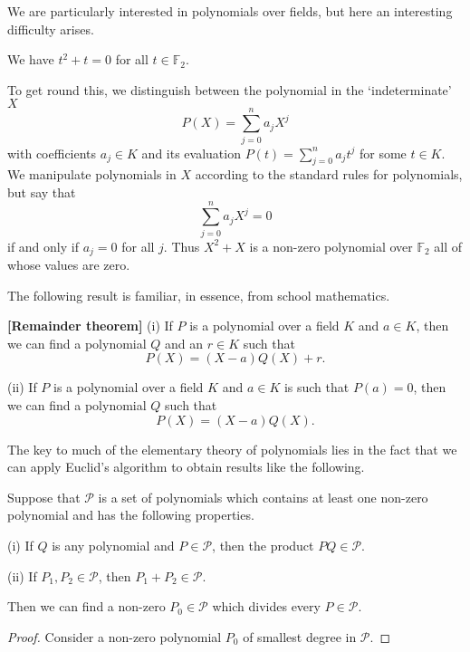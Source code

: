 We are particularly interested in polynomials over
fields, but here an interesting difficulty arises.
\begin{example}
We have $t^{2}+t=0$ for all $t\in{\mathbb F}_{2}$.
\end{example}
To get round this, we distinguish between the
polynomial in the `indeterminate' $X$
\[P(X)=\sum_{j=0}^{n}a_{j}X^{j}\]
with coefficients $a_{j}\in K$ and its
evaluation $P(t)=\sum_{j=0}^{n}a_{j}t^{j}$
for some $t\in K$. We manipulate polynomials in $X$
according to the standard rules for polynomials,
but say that
\[\sum_{j=0}^{n}a_{j}X^{j}=0\]
if and only if $a_{j}=0$ for all $j$.
Thus $X^{2}+X$ is a non-zero polynomial
over ${\mathbb F}_{2}$ all of whose values are zero.

The following result is familiar, in essence,
from school mathematics.
\begin{lemma}{\bf [Remainder theorem]}\label{remainder}
(i) If $P$ is a polynomial over a field $K$
and $a\in K$, then we can find a polynomial $Q$ and an
$r\in K$ such that
\[P(X)=(X-a)Q(X)+r.\]

(ii) If $P$ is a polynomial over a field $K$
and $a\in K$ is such that $P(a)=0$, then
we can find a polynomial $Q$ such that
\[P(X)=(X-a)Q(X).\]
\end{lemma}

The key to much of the elementary theory of
polynomials lies in the fact that we can apply
Euclid's algorithm to obtain results like the
following.
\begin{theorem}\label{greatest common}
Suppose that $\mathcal{P}$ is a
set of polynomials which contains at least one
non-zero polynomial and has the following properties.

(i) If $Q$ is any polynomial and $P\in\mathcal{P}$,
then the product $PQ\in\mathcal{P}$.

(ii) If $P_{1},P_{2}\in \mathcal{P}$,
then $P_{1}+P_{2}\in \mathcal{P}$.

Then we can find a non-zero $P_{0}\in\mathcal{P}$ which
divides every $P\in\mathcal{P}$.
\end{theorem}
\begin{proof} Consider a non-zero polynomial $P_{0}$
of smallest degree in ${\mathcal P}$.
\end{proof}

